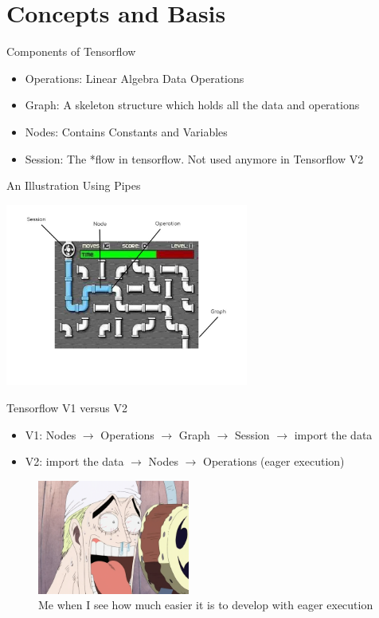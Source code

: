 \documentclass{beamer}
\begin{document}
\section{Concepts and Basis}

\begin{frame}[fragile]{Components of Tensorflow}
\begin{itemize}
	\item Operations: Linear Algebra Data Operations
	\item Graph: A skeleton structure which holds all the data and operations
	\item Nodes: Contains Constants and Variables
	\item Session: The *flow in tensorflow. Not used anymore in Tensorflow V2
\end{itemize}
\end{frame}

\begin{frame}[fragile]{An Illustration Using Pipes}
\begin{center}
{\includegraphics[width=8cm]{images/graph.jpg}}
\end{center}
\end{frame}

\begin{frame}[fragile]{Tensorflow V1 versus V2}
\begin{itemize}
	\item V1: Nodes $ \to $  Operations $ \to$ Graph $\to$ Session $\to$ import the data
	\item V2: import the data $\to$ Nodes  $\to$ Operations (eager execution)
\end{itemize}
\begin{center}
\begin{figure}
\includegraphics[width=5cm]{images/damndaniel.png}
\caption{Me when I see how much easier it is to develop with eager execution}
\end{figure}
\end{center}
\end{frame}
\end{document}
